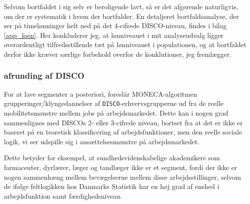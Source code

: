 Selvom bortfaldet i sig selv er beroligende lavt, så er det afgørende naturligvis, om der er systematik i hvem der bortfalder. En detaljeret bortfaldsanalyse, der ser på timelønninger helt ned på det 4-cifrede DISCO-niveau, findes i bilag \ref{app_loen}. Her konkluderer jeg, at lønniveauet i mit analyseudvalg ligger overordentligt tilfredsstillende tæt på lønniveauet i populationen, og at bortfaldet derfor ikke kræver særlige forbehold overfor de konklutioner, jeg fremlægger.  








%
\subsubsection{afrunding af DISCO}
%

For at lave segmenter a posteriori, foreslår MONECA-algoritmen grupperinger/klyngedannelser af \texttt{DISCO}-erhvervsgrupperne ud fra de reelle mobilitetsmønstre mellem jobs på arbejdsmarkedet. Dette kan i nogen grad sammenlignes med DISCOs 2- eller 3-cifrede niveau, bortset fra at det er ikke er baseret på en teoretisk klassificering af arbejdsfunktioner, men den reelle sociale logik, vi ser udspille sig i ansættelsesmønstre på arbejdsmarkedet.

Dette betyder for eksempel, at sundhedsvidenskabelige akademikere som farmaceuter, dyrlærer, læger og tandlæger ikke er et segment, fordi der ikke er nogen sammenhæng mellem bevægelserne mellem disse arbejdsstillinger, selvom de ifølge feltlogikken hos Danmarks Statistik har en høj grad af enshed i arbejdsfunktion samt færdighedsniveau. 


